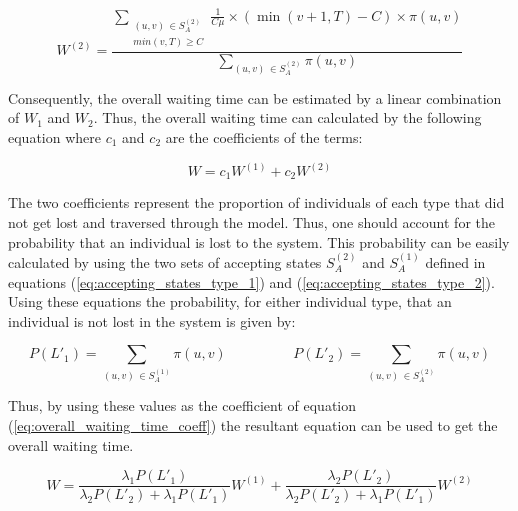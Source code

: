 \begin{equation}\label{eq:closed_form_waiting_type_2}
    W^{(2)} = \frac{\sum_{\substack{(u,v) \, \in S_A^{(2)} \\ min(v,T) \geq C}} 
    \frac{1}{C \mu} \times (\min(v+1,T)-C) \times \pi(u,v)}{\sum_{(u,v) \, 
    \in S_A^{(2)}} \pi(u,v)}
\end{equation}

Consequently, the overall waiting time can be estimated by a linear combination 
of \(W_1\) and \(W_2\). 
Thus, the overall waiting time can calculated by the following equation where 
\(c_1\) and \(c_2\) are the coefficients of the terms:

\begin{equation}\label{eq:overall_waiting_time_coeff}
    W = c_1 W^{(1)} + c_2 W^{(2)}
\end{equation}

The two coefficients represent the proportion of individuals of each type that 
did not get lost and traversed through the model.
Thus, one should account for the probability that an individual is lost to the 
system. 
This probability can be easily calculated by using the two sets of accepting 
states \(S_A^{(2)}\) and \(S_A^{(1)}\) defined in equations 
(\ref{eq:accepting_states_type_1}) and (\ref{eq:accepting_states_type_2}). 
Using these equations the probability, for either individual type, that an 
individual is not lost in the system is given by:

\begin{equation*}
    P(L'_1) = \sum_{(u,v) \, \in S_A^{(1)}} \pi(u,v) \hspace{2cm}
    P(L'_2) = \sum_{(u,v) \, \in S_A^{(2)}} \pi(u,v)
\end{equation*}
 
Thus, by using these values as the coefficient of equation 
(\ref{eq:overall_waiting_time_coeff}) the resultant equation can be used to get 
the overall waiting time. 

\begin{equation}\label{eq:overall_waiting_time}
    W = \frac{\lambda_1 P(L'_1)}{\lambda_2 P(L'_2) + \lambda_1 P(L'_1)} W^{(1)} + 
    \frac{\lambda_2 P(L'_2)}{\lambda_2 P(L'_2) + \lambda_1 P(L'_1)} W^{(2)}
\end{equation}
